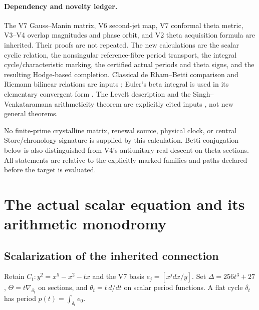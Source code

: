 \documentclass[11pt]{article}
\theoremstyle{definition}
\theoremstyle{remark}
\begin{document}
\paragraph{Dependency and novelty ledger.}
The V7 Gauss--Manin matrix, V6 second-jet map, V7 conformal theta metric,
V3--V4 overlap magnitudes and phase orbit, and V2 theta acquisition formula
are inherited. Their proofs are not repeated. The new calculations are the
scalar cyclic relation, the nonsingular reference-fibre period transport,
the integral cycle/characteristic marking, the certified actual periods and
theta signs, and the resulting Hodge-based completion. Classical de
Rham--Betti comparison and Riemann bilinear relations are inputs
\cite{KatzOda,KTdeRham,MilneAV}; Euler's beta integral is used in its elementary
convergent form \cite{DLMFBeta}. The Levelt description and the
Singh--Venkataramana arithmeticity theorem are explicitly cited inputs
\cite{BeukersHeckman,SinghVenkataramana}, not new general theorems.

No finite-prime crystalline matrix, renewal source, physical clock, or
central Store/chronology signature is supplied by this calculation. Betti
conjugation below is also distinguished from V4's antiunitary real descent on
theta sections. All statements are relative to the explicitly marked
families and paths declared before the target is evaluated.

\section{The actual scalar equation and its arithmetic monodromy}
\label{sec:v8-hypergeometric}

\subsection{Scalarization of the inherited connection}
Retain $C_t:y^2=x^5-x^2-tx$ and the V7 basis $e_j=[x^jdx/y]$. Set
$\Delta=256t^3+27$, $\Theta=t\nabla_{\partial_t}$ on sections, and
$\theta_t=t\,d/dt$ on scalar period functions. A flat cycle $\delta_t$
has period $p(t)=\int_{\delta_t}e_0$.
\end{document}
